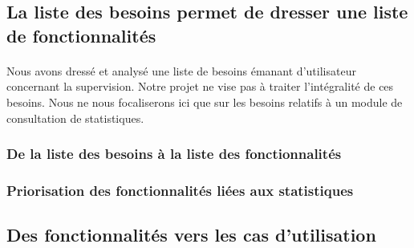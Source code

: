 	\subsection{La liste des besoins permet de dresser une liste de fonctionnalités}
		\paragraph{}%
		Nous avons dressé et analysé une liste de besoins émanant d'utilisateur
		concernant la supervision. Notre projet ne vise pas à traiter l'intégralité de
		ces besoins. Nous ne nous focaliserons ici que sur les besoins relatifs à un
		module de consultation de statistiques.
		
		\subsubsection{De la liste des besoins à la liste des fonctionnalités}
			\paragraph{}%
			
			\paragraph{}%
			
		\subsubsection{Priorisation des fonctionnalités liées aux statistiques}
			\paragraph{}%
			
			\paragraph{}%
			
			\paragraph{}%
	
	\subsection{Des fonctionnalités vers les cas d'utilisation}

